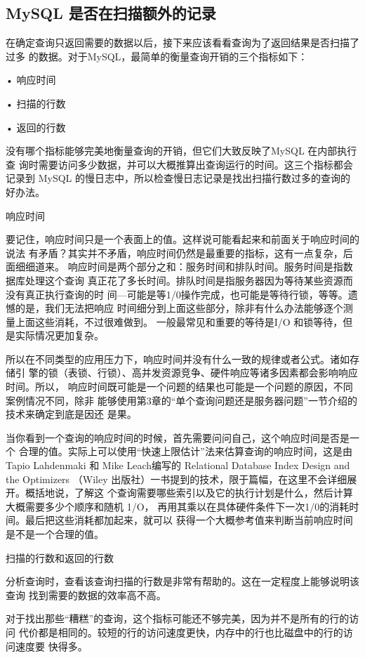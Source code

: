 \subsection{MySQL 是否在扫描额外的记录}
在确定查询只返回需要的数据以后，接下来应该看看查询为了返回结果是否扫描了过多
的数据。对于MySQL，最简单的衡量查询开销的三个指标如下：

• 响应时间

• 扫描的行数

• 返回的行数

没有哪个指标能够完美地衡量查询的开销，但它们大致反映了MySQL 在内部执行查
询时需要访问多少数据，并可以大概推算出查询运行的时间。这三个指标都会记录到
MySQL 的慢日志中，所以检查慢日志记录是找出扫描行数过多的查询的好办法。

响应时间

要记住，响应时间只是一个表面上的值。这样说可能看起来和前面关于响应时间的说法
有矛盾？其实并不矛盾，响应时间仍然是最重要的指标，这有一点复杂，后面细细道来。
响应时间是两个部分之和：服务时间和排队时间。服务时间是指数据库处理这个查询
真正花了多长时间。排队时间是指服务器因为等待某些资源而没有真正执行查询的时
间—可能是等1/0操作完成，也可能是等待行锁，等等。遗憾的是，我们无法把响应
时间细分到上面这些部分，除非有什么办法能够逐个测量上面这些消耗，不过很难做到。
一般最常见和重要的等待是I/O 和锁等待，但是实际情况更加复杂。

所以在不同类型的应用压力下，响应时间并没有什么一致的规律或者公式。诸如存储引
擎的锁（表锁、行锁）、高并发资源竞争、硬件响应等诸多因素都会影响响应时间。所以，
响应时间既可能是一个问题的结果也可能是一个问题的原因，不同案例情况不同，除非
能够使用第3章的“单个查询问题还是服务器问题”一节介绍的技术来确定到底是因还
是果。

当你看到一个查询的响应时间的时候，首先需要问问自己，这个响应时间是否是一个
合理的值。实际上可以使用“快速上限估计”法来估算查询的响应时间，这是由 Tapio
Lahdenmaki 和 Mike Leach编写的 Relational Database Index Design and the Optimizers
（Wiley 出版社）一书提到的技术，限于篇幅，在这里不会详细展开。概括地说，了解这
个查询需要哪些索引以及它的执行计划是什么，然后计算大概需要多少个顺序和随机 1/O，
再用其乘以在具体硬件条件下一次1/0的消耗时间。最后把这些消耗都加起来，就可以
获得一个大概参考值来判断当前响应时间是不是一个合理的值。

扫描的行数和返回的行数

分析查询时，查看该查询扫描的行数是非常有帮助的。这在一定程度上能够说明该查询
找到需要的数据的效率高不高。

对于找出那些“糟糕”的查询，这个指标可能还不够完美，因为并不是所有的行的访问
代价都是相同的。较短的行的访问速度更快，内存中的行也比磁盘中的行的访问速度要
快得多。


